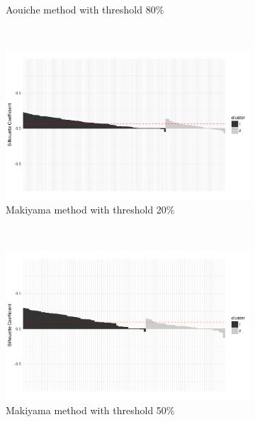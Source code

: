 \begin{figure}[h!]
\begin{subfigure}[b]{0.322\textwidth}
        \caption{Aouiche method with threshold 80\%}
    \end{subfigure}
    \\
    \begin{subfigure}[b]{0.322\textwidth}%
        \centering
        \includegraphics[width=\textwidth]{graphics/sil_ub_makiyama_0.2.pdf}
        \caption{Makiyama method with threshold 20\%}
    \end{subfigure}%
    ~
    \begin{subfigure}[b]{0.322\textwidth}%
        \centering
        \includegraphics[width=\textwidth]{graphics/sil_ub_makiyama_0.5.pdf}
        \caption{Makiyama method with threshold 50\%}
    \end{subfigure}
    ~
    \begin{subfigure}[b]{0.322\textwidth}%
        \centering

\end{subfigure}
\end{figure}
